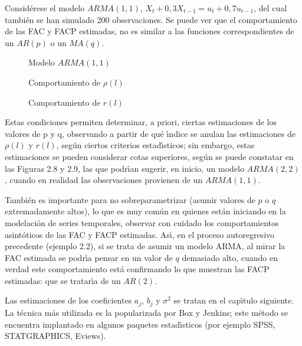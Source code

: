 \begin{ejemplo}
Consid\'{e}rese el modelo $ARMA(1,1)$, $X_{t}+0,3X_{t-1}=u_{t}+0,7u_{t-1}$, del cual tambi\'{e}n se han simulado 200 observaciones. Se puede ver que el comportamiento de las FAC y FACP estimadas, no es similar a las funciones correspondientes de un $AR(p)$ o un $MA(q)$. 

\begin{figure}[H]
\centering
\caption{Modelo $ARMA(1,1)$}
\end{figure}

\begin{figure}[H]
\centering
\caption{Comportamiento de $\rho (l)$}
\end{figure}

\begin{figure}[H]
\centering
\caption{Comportamiento de $r(l)$}
\end{figure}

\end{ejemplo}


Estas condiciones permiten determinar, a priori, ciertas estimaciones de los 
valores de p y q, observando a partir de qu\'{e} \'{\i}ndice se anulan las 
estimaciones de $\rho (l)$ y $r(l)$, seg\'{u}n ciertos criterios 
estad\'{\i}sticos; sin embargo, estas estimaciones se pueden considerar 
cotas superiores, seg\'{u}n se puede constatar en las Figuras 2.8 y 2.9, las 
que podr\'{\i}an sugerir, en inicio, un modelo $ARMA(2,2)$, cuando en 
realidad las observaciones provienen de un $ARMA(1,1)$. 

Tambi\'{e}n es importante para no sobreparametrizar (asumir valores de $p$ o $q$ 
extremadamente altos), lo que es muy com\'{u}n en quienes est\'{a}n 
iniciando en la modelaci\'{o}n de series temporales, observar con cuidado 
los comportamientos asint\'{o}ticos de las FAC y FACP estimadas. As\'{\i}, 
en el proceso autoregresivo precedente (ejemplo 2.2), si se trata de asumir 
un modelo ARMA, al mirar la FAC estimada se podr\'{\i}a pensar en un valor 
de $q$ demasiado alto, cuando en verdad este comportamiento est\'{a} 
confirmando lo que muestran las FACP estimadas: que se tratar\'{\i}a de un 
$AR(2)$.

Las estimaciones de los coeficientes $a_{j}$, $b_{j}$ y $\sigma^{2}$ 
se tratan en el cap\'{\i}tulo siguiente. La t\'{e}cnica m\'{a}s utilizada es 
la popularizada por Box y Jenkins; este m\'{e}todo se encuentra implantado 
en algunos paquetes estad\'{\i}sticos (por ejemplo SPSS, STATGRAPHICS, 
Eviews).

